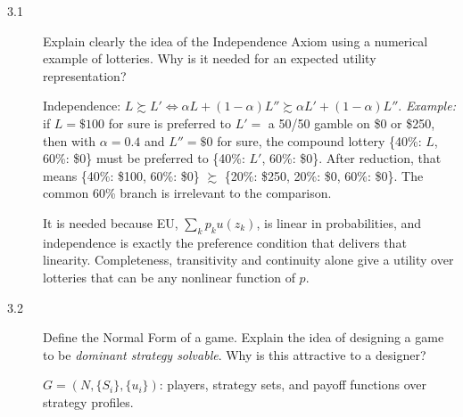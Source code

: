 \begin{description}
\item[3.1] Explain clearly the idea of the Independence Axiom using a numerical example of lotteries. Why is it needed for an expected utility representation?
\begin{solution}
Independence: $L\succsim L'\iff\alpha L+(1-\alpha)L''\succsim\alpha L'+(1-\alpha)L''$. \emph{Example:} if $L=\$100$ for sure is preferred to $L'=$ a 50/50 gamble on \$0 or \$250, then with $\alpha=0.4$ and $L''=\$0$ for sure, the compound lottery \{40\%: $L$, 60\%: \$0\} must be preferred to \{40\%: $L'$, 60\%: \$0\}. After reduction, that means \{40\%: \$100, 60\%: \$0\} $\succsim$ \{20\%: \$250, 20\%: \$0, 60\%: \$0\}. The common 60\% branch is irrelevant to the comparison.

It is needed because EU, $\sum_kp_ku(z_k)$, is linear in probabilities, and independence is exactly the preference condition that delivers that linearity. Completeness, transitivity and continuity alone give a utility over lotteries that can be any nonlinear function of $p$.
\end{solution}
\item[3.2] Define the Normal Form of a game. Explain the idea of designing a game to be \emph{dominant strategy solvable}. Why is this attractive to a designer?
\begin{solution}
$G=(N,\{S_i\},\{u_i\})$: players, strategy sets, and payoff functions over strategy profiles.


\end{solution}
\end{description}
